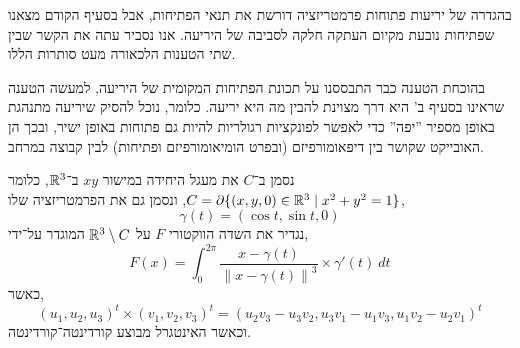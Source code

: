 \subquestion{}
בהגדרה של יריעות פתוחות פרמטריזציה דורשת את תנאי הפתיחות, אבל בסעיף הקודם מצאנו שפתיחות נובעת מקיום העתקה חלקה לסביבה של היריעה.
אנו נסביר עתה את הקשר שבין שתי הטענות הלכאורה מעט סותרות הללו.
\begin{solution}
	בהוכחת הטענה כבר התבססנו על תכונת הפתיחות המקומית של היריעה, למעשה הטענה שראינו בסעיף ב' היא דרך מצוינת להבין מה היא יריעה.
	כלומר, נוכל להסיק שיריעה מתנהגת באופן מספיר ''יפה'' כדי לאפשר לפונקציות רגולריות להיות גם פתוחות באופן ישיר, ובכך הן האובייקט שקושר בין דיפאומורפיזם (ובפרט הומיאומורפיזם ופתיחות) לבין קבוצה במרחב.
\end{solution}

\question{}
נסמן ב־$C$ את מעגל היחידה במישור $xy$ ב־$\mathbb{R}^3$, כלומר $C = \partial \{ (x, y, 0) \in \mathbb{R}^3 \mid x^2 + y^2 = 1 \}$,
ונסמן גם את הפרמטריזציה שלו,
\[
	\gamma(t)
	= (\cos t, \sin t, 0)
\]
נגדיר את השדה הווקטורי $F$ על $\mathbb{R}^3 \setminus C$ המוגדר על־ידי,
\[
	F(x)
	= \int_{0}^{2 \pi} \frac{x - \gamma(t)}{{\lVert x - \gamma(t) \rVert}^3} \times \gamma'(t)\ dt
\]
כאשר,
\[
	{(u_1, u_2, u_3)}^t \times {(v_1, v_2, v_3)}^t
	= {(u_2 v_3 - u_3 v_2, u_3 v_1 - u_1 v_3, u_1 v_2 - u_2 v_1)}^t
\]
וכאשר האינטגרל מבוצע קורדינטה־קורדינטה.

